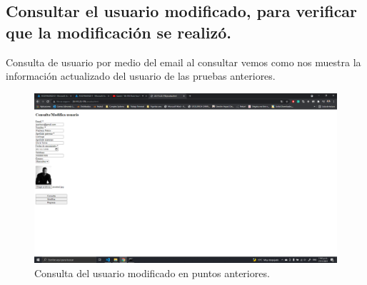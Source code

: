 \documentclass[11pt]{article}
\begin{document}
		\subsection{Consultar el usuario modificado, para verificar que la modificación se realizó.}
		Consulta de usuario por medio del email al consultar vemos como nos muestra la información actualizado del usuario de las pruebas anteriores.
		\begin{figure}[H]
			\centering
			\includegraphics[scale=0.34]{resources/p9.7.png}
			\caption{Consulta del usuario modificado en puntos anteriores.}\label{fig:picture}
		\end{figure}
\end{document}

